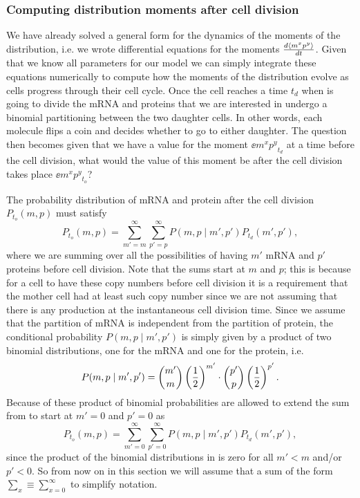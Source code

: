 \subsubsection{Computing distribution moments after cell division}

We have already solved a general form for the dynamics of the moments of the
distribution, i.e. we wrote differential equations for the moments ${d\left\langle m^x
p^y \right\rangle\over dt}$. Given that we know all parameters for our model we can simply
integrate these equations numerically to compute how the moments of the
distribution evolve as cells progress through their cell cycle. Once the cell
reaches a time $t_d$ when is going to divide the mRNA and proteins that we are
interested in undergo a binomial partitioning between the two daughter cells.
In other words, each molecule flips a coin and decides whether to go to either
daughter. The question then becomes given that we have a value for the moment
$\ee{m^x p^y}_{t_d}$ at a time before the cell division, what would the value
of this moment be after the cell division takes place $\ee{m^x p^y}_{t_o}$?

The probability distribution of mRNA and protein after the cell division
$P_{t_o}(m, p)$ must satisfy
\begin{equation}
  P_{t_o}(m, p) = \sum_{m'=m}^\infty \sum_{p'=p}^\infty 
                  P(m, p \mid m', p') P_{t_d}(m', p'),
\label{eq_dist_post_div}
\end{equation}
where we are summing over all the possibilities of having $m'$ mRNA and $p'$
proteins before cell division. Note that the sums start at $m$ and $p$; this is
because for a cell to have these copy numbers before cell division it is a
requirement that the mother cell had at least such copy number since we are not
assuming that there is any production at the instantaneous cell division time.
Since we assume that the partition of mRNA is independent from the partition of
protein, the conditional probability $P(m, p \mid m', p')$ is simply given by a
product of two binomial distributions, one for the mRNA and one for the
protein, i.e.
\begin{equation}
P(m, p \mid m', p') = {m' \choose m} \left( {1 \over 2} \right)^{m'} \cdot
                      {p' \choose p} \left( {1 \over 2} \right)^{p'}.
\label{eq_binom_prod}
\end{equation}
Because of these product of binomial probabilities are allowed to extend the
sum from
 to start at $m'=0$ and $p'=0$ as
\begin{equation}
  P_{t_o}(m, p) = \sum_{m'=0}^\infty \sum_{p'=0}^\infty 
                  P(m, p \mid m', p') P_{t_d}(m', p'),
\end{equation}
since the product of the binomial distributions in  is zero
for all $m' < m$ and/or $p' < 0$. So from now on in this section we will assume
that a sum of the form $\sum_x \equiv \sum_{x=0}^\infty$ to simplify notation.

